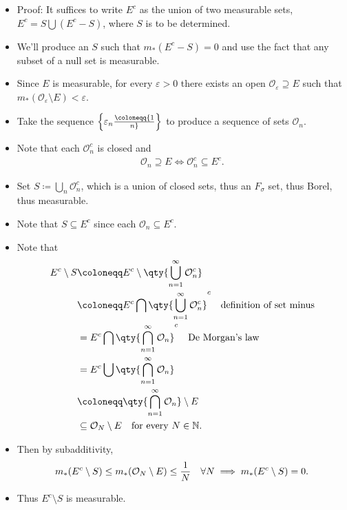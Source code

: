 \begin{concept}
\begin{itemize}
  \begin{itemize}
  \tightlist
  \item
    Proof: It suffices to write \(E^c\) as the union of two measurable
    sets, \(E^c = S \displaystyle\bigcup(E^c - S)\), where \(S\) is to
    be determined.
  \item
    We'll produce an \(S\) such that \(m_*(E^c - S) = 0\) and use the
    fact that any subset of a null set is measurable.
  \item
    Since \(E\) is measurable, for every \({\varepsilon}> 0\) there
    exists an open \({\mathcal{O}}_{\varepsilon}\supseteq E\) such that
    \(m_*({\mathcal{O}}_{\varepsilon}\setminus E) < {\varepsilon}\).
  \item
    Take the sequence
    \(\left\{{{\varepsilon}_n \coloneqq{1\over n}}\right\}\) to produce
    a sequence of sets \({\mathcal{O}}_n\).
  \item
    Note that each \({\mathcal{O}}_n^c\) is closed and
    \begin{align*}
    {\mathcal{O}}_n \supseteq E \iff {\mathcal{O}}_n^c \subseteq E^c
    .\end{align*}
  \item
    Set \(S \coloneqq\displaystyle\bigcup_n {\mathcal{O}}_n^c\), which
    is a union of closed sets, thus an \(F_\sigma\) set, thus Borel,
    thus measurable.
  \item
    Note that \(S\subseteq E^c\) since each
    \({\mathcal{O}}_n \subseteq E^c\).
  \item
    Note that
    \begin{align*}
    E^c\setminus S 
    &\coloneqq E^c \setminus \qty{\displaystyle\bigcup_{n=1}^\infty {\mathcal{O}}_n^c} \\
    &\coloneqq E^c \displaystyle\bigcap\qty{\displaystyle\bigcup_{n=1}^\infty {\mathcal{O}}_n^c}^c  \quad\text{definition of set minus} \\ 
    &= E^c \displaystyle\bigcap\qty{\displaystyle\bigcap_{n=1}^\infty {\mathcal{O}}_n}^c  \quad \text{De Morgan's law}\\
    &= E^c \displaystyle\bigcup\qty{\displaystyle\bigcap_{n=1}^\infty {\mathcal{O}}_n}  \\
    &\coloneqq\qty{ \displaystyle\bigcap_{n=1}^\infty {\mathcal{O}}_n} \setminus E \\
    & \subseteq {\mathcal{O}}_N \setminus E \quad \text{for every } N\in {\mathbb{N}}
    .\end{align*}
  \item
    Then by subadditivity,
    \begin{align*}
    m_*(E^c\setminus S) \leq m_*({\mathcal{O}}_N \setminus E) \leq {1\over N} \quad \forall N \implies m_*(E^c\setminus S) = 0
    .\end{align*}
  \item
    Thus \(E^c\setminus S\) is measurable.
  \end{itemize}
\end{itemize}

\end{concept}

